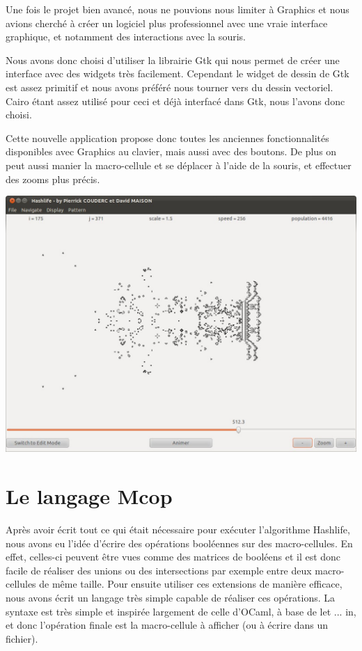 \documentclass[a4paper,12pt]{report}
\begin{document}
Une fois le projet bien avancé, nous ne pouvions nous limiter à Graphics et nous
avions cherché à créer un logiciel plus professionnel avec une vraie interface
graphique, et notamment des interactions avec la souris.

Nous avons donc choisi d'utiliser la librairie Gtk qui nous permet de
créer une interface avec des widgets très facilement.
Cependant le widget de dessin de Gtk est assez primitif et nous avons
préféré nous tourner vers du dessin vectoriel. Cairo étant assez
utilisé pour ceci et déjà interfacé dans Gtk, nous l'avons
donc choisi.

Cette nouvelle application propose donc toutes les anciennes
fonctionnalités disponibles avec Graphics au clavier, mais aussi avec
des boutons. De plus on peut aussi manier la macro-cellule et se
déplacer à l'aide de la souris, et effectuer des zooms plus précis.

\begin{center}
  \includegraphics[scale=0.4]{screenshot.jpg}
\end{center}

\section{Le langage Mcop}

Après avoir écrit tout ce qui était nécessaire pour exécuter l'algorithme
Hashlife, nous avons eu l'idée d'écrire des opérations booléennes sur des
macro-cellules. En effet, celles-ci peuvent être vues comme des matrices de
booléens et il est donc facile de réaliser des unions ou des intersections par
exemple entre deux macro-cellules de même taille. Pour ensuite utiliser ces
extensions de manière efficace, nous avons écrit un langage très simple capable
de réaliser ces opérations. La syntaxe est très simple et inspirée largement de
celle d'OCaml, à base de let ... in, et donc l'opération finale est la
macro-cellule à afficher (ou à écrire dans un fichier).
\end{document}
